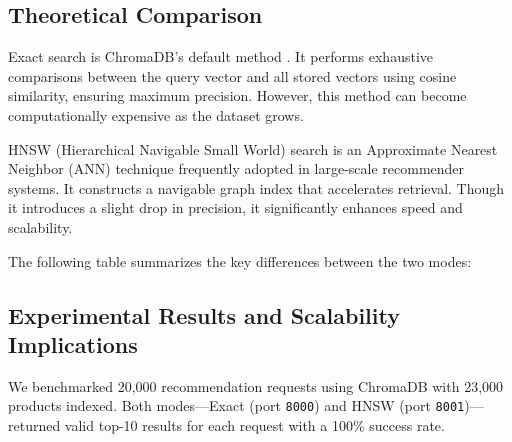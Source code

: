 \subsection{Theoretical Comparison}
\par Exact search is ChromaDB’s default method . It performs exhaustive comparisons between the query vector and all stored vectors using cosine similarity, ensuring maximum precision. However, this method can become computationally expensive as the dataset grows.

\par HNSW (Hierarchical Navigable Small World) search is an Approximate Nearest Neighbor (ANN) technique frequently adopted in large-scale recommender systems. It constructs a navigable graph index that accelerates retrieval. Though it introduces a slight drop in precision, it significantly enhances speed and scalability.

\noindent
The following table summarizes the key differences between the two modes:

\begin{table}[h!]
\centering
{}
\caption{Key Differences: Default vs. HNSW Search}
\label{tab:theoretical-comparison}
\end{table}

\subsection{Experimental Results and Scalability Implications}

We benchmarked 20,000 recommendation requests using ChromaDB with 23,000 products indexed. Both modes—Exact (port \texttt{8000}) and HNSW (port \texttt{8001})—returned valid top-10 results for each request with a 100\% success rate.

\begin{table}[H]
\centering
\caption{Benchmark Results for Recommendation Modes}
\label{tab:benchmark-results}
\end{table}

